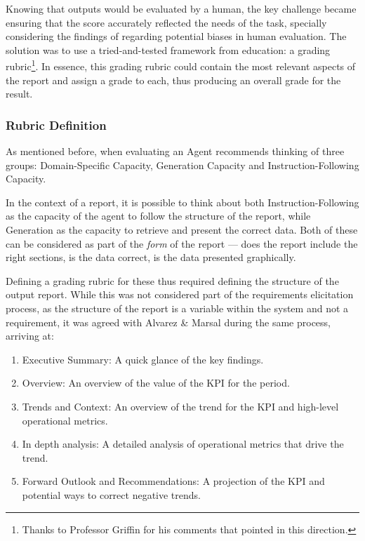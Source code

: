 \documentclass[a4paper]{report}
\begin{document}
Knowing that outputs would be evaluated by a human, the key challenge became ensuring that the score accurately reflected the needs of the task, specially considering the findings of \cite{hu2023decipher} regarding potential biases in human evaluation. The solution was to use a tried-and-tested framework from education: a grading rubric\footnote{Thanks to Professor Griffin for his comments that pointed in this direction.}. In essence, this grading rubric could contain the most relevant aspects of the report and assign a grade to each, thus producing an overall grade for the result. 

\subsubsection{Rubric Definition}

As mentioned before, when evaluating an Agent \cite{aiebook2025} recommends thinking of three groups: Domain-Specific Capacity, Generation Capacity and Instruction-Following Capacity.

In the context of a report, it is possible to think about both Instruction-Following as the capacity of the agent to follow the structure of the report, while Generation as the capacity to retrieve and present the correct data. Both of these can be considered as part of the \textit{form} of the report --- does the report include the right sections, is the data correct, is the data presented graphically.

Defining a grading rubric for these thus required defining the structure of the output report. While this was not considered part of the requirements elicitation process, as the structure of the report is a variable within the system and not a requirement, it was agreed with Alvarez \& Marsal during the same process, arriving at:

\begin{enumerate}
    \item Executive Summary: A quick glance of the key findings.
    \item Overview: An overview of the value of the KPI for the period.
    \item Trends and Context: An overview of the trend for the KPI and high-level operational metrics.
    \item In depth analysis: A detailed analysis of operational metrics that drive the trend.
    \item Forward Outlook and Recommendations: A projection of the KPI and potential ways to correct negative trends.
\end{enumerate}
\end{document}

